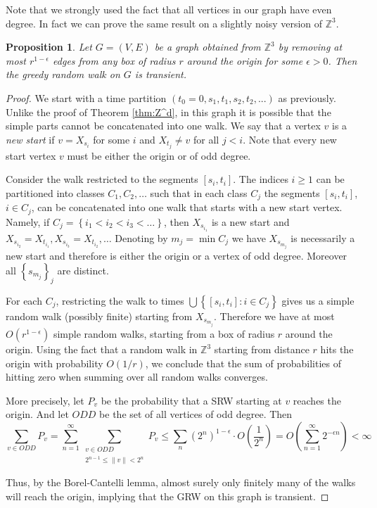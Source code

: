 \documentclass[12pt,a4paper]{article}
\newcommand{\set}[1]{{\left\{#1 \right\}}}
\newcommand{\0}{{\bf 0}}
\newcommand{\Z}{{\mathbb Z}}
\newcommand{\eps}{\epsilon}
\newcommand{\norm}[1]{\left\| #1 \right\|}
\newtheorem{proposition}[theorem]{Proposition}
\begin{document}
    Note that we strongly used the fact that all vertices in our graph have even degree.
    In fact we can prove the same result on a slightly noisy version of $\Z^3$.
    \begin{proposition}
        Let $G = (V,E)$ be a graph obtained from $\Z^3$ by removing
        at most $r^{1 - \eps}$ edges from any box of radius $r$ around the origin for some $\eps > 0$.
        Then the greedy random walk on $G$ is transient.
    \end{proposition}

    \begin{proof}
        We start with a time partition $(t_0 = 0,s_1,t_1,s_2,t_2,...)$ as previously.
        Unlike the proof of Theorem \ref{thm:Z^d},
        in this graph it is possible that the simple parts cannot be concatenated into one walk.
        We say that a vertex $v$ is a \emph{new start} if $v = X_{s_i}$ for some $i$ and
        $X_{t_j} \neq v$ for all $j < i$.
        Note that every new start vertex $v$ must be either the origin or of odd degree.

        Consider the walk restricted to the segments $[s_i, t_i]$.
        The indices $i \geq 1$ can be partitioned into classes $C_1, C_2, \dots$
        such that in each class $C_j$ the segments $[s_i, t_i]$, $i \in C_j$,
        can be concatenated into one walk that starts with a new start vertex.
        Namely, if $C_j = \set{i_1 < i_2 < i_3 < \dots}$,
        then $X_{s_{i_1}}$ is a new start and
        $X_{s_{i_2}} = X_{t_{i_1}}, X_{s_{i_3}} = X_{t_{i_2}}, \dots$
        Denoting by $m_j = \min C_j$ we have $X_{s_{m_j}}$ is necessarily
        a new start and therefore is either the origin or a vertex of odd degree.
        Moreover all $\set{s_{m_j} }_j$ are distinct.

        For each $C_j$, restricting the walk to times $\bigcup\set{[s_i, t_i] : i \in C_j}$ gives us a
        simple random walk (possibly finite) starting from $X_{s_{m_j}}$.
        Therefore we have at most $O(r^{1 - \eps})$ simple random walks,
        starting from a box of radius $r$ around the origin.
        Using the fact that a random walk in $\Z^3$ starting from distance $r$ hits the origin with probability $O(1/r)$,
        we conclude that the sum of probabilities of hitting zero when summing over all random walks converges.

        More precisely, let $P_v$ be the probability that a SRW starting at $v$ reaches the origin.
        And let $ODD$ be the set of all vertices of odd degree. Then
        \[
            \sum_{v \in ODD}P_v
                = \sum_{n = 1}^\infty \sum_{\substack{v \in ODD \\ 2^{n-1} \leq \norm{v} < 2^n }} P_v
                \leq \sum_n (2^n)^{1-\eps} \cdot O(\frac{1}{2^n}) = O \left( \sum_{n = 1}^\infty 2^{ -\eps n} \right)< \infty
        \]

        Thus, by the Borel-Cantelli lemma, almost surely only finitely many of the walks will reach the origin,
        implying that the GRW on this graph is transient.
    \end{proof}
\end{document}
